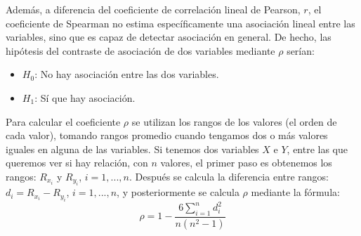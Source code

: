 Además, a diferencia del coeficiente de correlación lineal de Pearson, $r$, el coeficiente de Spearman no estima específicamente una
asociación lineal entre las variables, sino que es capaz de detectar asociación en general. De hecho, las hipótesis del contraste de
asociación de dos variables mediante $\rho$ serían:
\begin{itemize}
\item $H_0$: No hay asociación entre las dos variables.
\item $H_1$: Sí que hay asociación.
\end{itemize}

Para calcular el coeficiente $\rho$ se utilizan los rangos de los valores (el orden de cada valor), tomando rangos promedio cuando tengamos
dos o más valores iguales en alguna de las variables. Si tenemos dos variables $X$ e $Y$, entre las que queremos ver si hay relación, con
$n$ valores, el primer paso es obtenemos los rangos: $R_{x_i}$ y $R_{y_i}$, $i=1,...,n$. Después se calcula la diferencia entre rangos:
$d_i=R_{x_i}-R_{y_i}$, $i=1,...,n$, y posteriormente se calcula $\rho$ mediante la fórmula:
\[
\rho  = 1 - \frac{{6\sum\limits_{i = 1}^n {d_i ^2 } }}{{n\left( {n^2  - 1} \right)}}
\]

